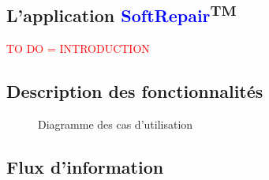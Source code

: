 \documentclass{article}[12pt]
\begin{document}
\subsection{L'application  \textcolor{blue}{SoftRepair}\textsuperscript{TM}}
 \textcolor{red}{TO DO = INTRODUCTION}
\subsection{Description des fonctionnalités}
\begin{figure}[H]
	\centering
	\caption{Diagramme des cas d'utilisation}
\end{figure}
\subsection{Flux d'information}
\end{document}
